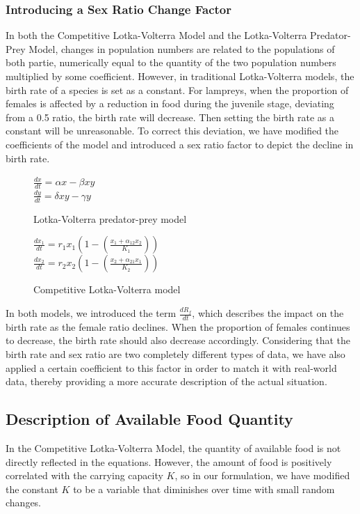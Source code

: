 \documentclass[12pt]{article}
\begin{document}
\subsubsection{Introducing a Sex Ratio Change Factor}
In both the Competitive Lotka-Volterra Model and the Lotka-Volterra Predator-Prey Model, changes 
in population numbers are related to the populations of both partie, numerically equal to the 
quantity of the two population numbers multiplied by some coefficient. However, in traditional 
Lotka-Volterra models, the birth rate of a species is set as a constant. For lampreys, when the 
proportion of females is affected by a reduction in food during the juvenile stage, deviating 
from a 0.5 ratio, the birth rate will decrease. Then setting the birth rate as a constant will 
be unreasonable. To correct this deviation, we have modified the coefficients of the model and 
introduced a sex ratio factor to depict the decline in birth rate.  
\begin{figure}[h]
	\large
	\centering
	$\frac{dx}{dt}=\alpha x - \beta xy$ \\
	$\frac{dy}{dt}=\delta xy - \gamma y$
	\caption*{Lotka-Volterra predator-prey model}
\end{figure}

\begin{figure}[h]
	\large
	\centering
	$\frac{dx_1}{dt}=r_1x_1(1-(\frac{x_1+\alpha_{12}x_2}{K_1}))$ \\
	$\frac{dx_2}{dt}=r_2x_2(1-(\frac{x_2+\alpha_{21}x_1}{K_2}))$
	\caption*{Competitive Lotka-Volterra model}
\end{figure}
In both models, we introduced the term $\frac{dR_f}{dt}$, which describes the impact on the birth 
rate as the female ratio declines. When the proportion of females continues to decrease, the 
birth rate should also decrease accordingly. Considering that the birth rate and sex ratio are 
two completely different types of data, we have also applied a certain coefficient to this factor 
in order to match it with real-world data, thereby providing a more accurate description of the 
actual situation. 
\subsection*{Description of Available Food Quantity}
In the Competitive Lotka-Volterra Model, the quantity of available food is not directly reflected 
in the equations. However, the amount of food is positively correlated with the carrying 
capacity $K$, so in our formulation, we have modified the constant $K$ to be a variable that 
diminishes over time with small random changes.  
\end{document}
